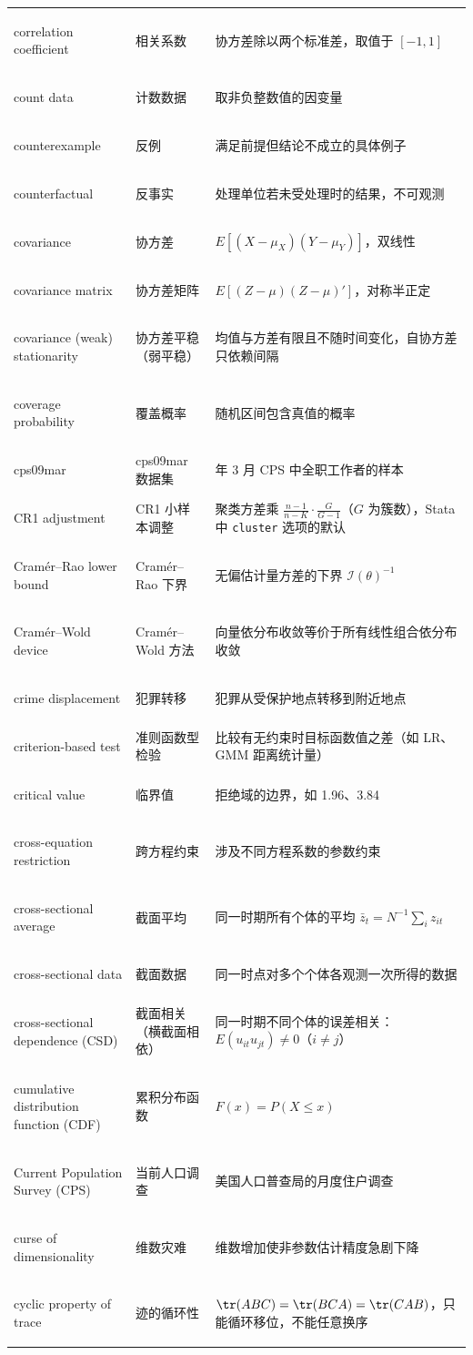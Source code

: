 \begin{longtable}{@{}>{\bfseries\boldmath\raggedright\arraybackslash}p{4.6cm}>{\raggedright\arraybackslash}p{3.2cm}>{\raggedright\arraybackslash}p{\dimexpr\textwidth-7.8cm-4\tabcolsep\relax}@{}}
correlation coefficient & 相关系数 & 协方差除以两个标准差，取值于 $[-1,1]$ \\
count data & 计数数据 & 取非负整数值的因变量 \\
counterexample & 反例 & 满足前提但结论不成立的具体例子 \\
counterfactual & 反事实 & 处理单位若未受处理时的结果，不可观测 \\
covariance & 协方差 & $E[(X-\mu_X)(Y-\mu_Y)]$，双线性 \\
covariance matrix & 协方差矩阵 & $E[(Z-\mu)(Z-\mu)']$，对称半正定 \\
covariance (weak) stationarity & 协方差平稳（弱平稳） & 均值与方差有限且不随时间变化，自协方差只依赖间隔 \\
coverage probability & 覆盖概率 & 随机区间包含真值的概率 \\
cps{}09mar & cps{}09mar 数据集 & 2009 年 3 月 CPS 中全职工作者的样本 \\
CR1 adjustment & CR1 小样本调整 & 聚类方差乘 $\frac{n-1}{n-K}\cdot\frac{G}{G-1}$（$G$ 为簇数），Stata 中 \texttt{cluster} 选项的默认 \\
Cramér--Rao lower bound & Cramér--Rao 下界 & 无偏估计量方差的下界 $\mathcal{I}(\theta)^{-1}$ \\
Cramér--Wold device & Cramér--Wold 方法 & 向量依分布收敛等价于所有线性组合依分布收敛 \\
crime displacement & 犯罪转移 & 犯罪从受保护地点转移到附近地点 \\
criterion-based test & 准则函数型检验 & 比较有无约束时目标函数值之差（如 LR、GMM 距离统计量） \\
critical value & 临界值 & 拒绝域的边界，如 1.96、3.84 \\
cross-equation restriction & 跨方程约束 & 涉及不同方程系数的参数约束 \\
cross-sectional average & 截面平均 & 同一时期所有个体的平均 $\bar z_t=N^{-1}\sum_iz_{it}$ \\
cross-sectional data & 截面数据 & 同一时点对多个个体各观测一次所得的数据 \\
cross-sectional dependence (CSD) & 截面相关（横截面相依） & 同一时期不同个体的误差相关：$E(u_{it}u_{jt})\ne0$（$i\ne j$） \\
cumulative distribution function (CDF) & 累积分布函数 & $F(x)=P(X\le x)$ \\
Current Population Survey (CPS) & 当前人口调查 & 美国人口普查局的月度住户调查 \\
curse of dimensionality & 维数灾难 & 维数增加使非参数估计精度急剧下降 \\
cyclic property of trace & 迹的循环性 & $\tr(ABC)=\tr(BCA)=\tr(CAB)$，只能循环移位，不能任意换序 \\
\end{longtable}

